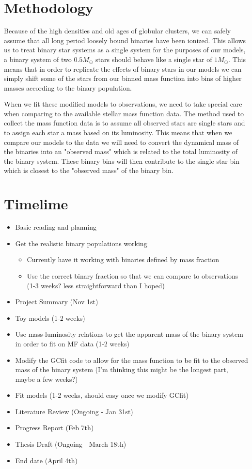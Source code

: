 \documentclass[12pt,letterpaper]{article}
\begin{document}
\section{Methodology}

Because of the high densities and old ages of globular clusters, we can safely assume that all long
period loosely bound binaries have been ionized. This allows us to treat binary star systems as a
single system for the purposes of our models, a binary system of two $0.5 M_\odot$ stars should
behave like a single star of $ 1 M_\odot$. This means that in order to replicate the effects of
binary stars in our models we can simply shift some of the stars from our binned mass function into
bins of higher masses according to the binary population.

When we fit these modified models to observations, we need to take special care when comparing to
the available stellar mass function data. The method used to collect the mass function data is to
assume all observed stars are single stars and to assign each star a mass based on its luminosity.
This means that when we compare our models to the data we will need to convert the dynamical mass of
the binaries into an "observed mass" which is related to the total luminosity of the binary system.
These binary bins will then contribute to the single star bin which is closest to the "observed
mass" of the binary bin.

\section{Timelime}
\begin{itemize}
	\item Basic reading and planning \checkmark
	\item Get the realistic binary populations working
	      \begin{itemize}
		      \item Currently have it working with binaries defined by mass fraction
		            \checkmark
		      \item Use the correct binary fraction so that we can compare to observations
		            (1-3 weeks? less straightforward than I hoped)
	      \end{itemize}
	\item Project Summary (Nov 1st)
	\item Toy models (1-2 weeks)
	\item Use mass-luminosity relations to get the apparent mass of the binary system in order
	      to fit on MF data (1-2 weeks)
	\item Modify the GCfit code to allow for the mass function to be fit to the observed mass of
	      the binary system (I'm thinking this might be the longest part, maybe a few weeks?)
	\item Fit models (1-2 weeks, should easy once we modify GCfit)
	\item Literature Review (Ongoing - Jan 31st)
	\item Progress Report (Feb 7th)
	\item Thesis Draft (Ongoing - March 18th)
	\item End date (April 4th)
\end{itemize}
\end{document}

